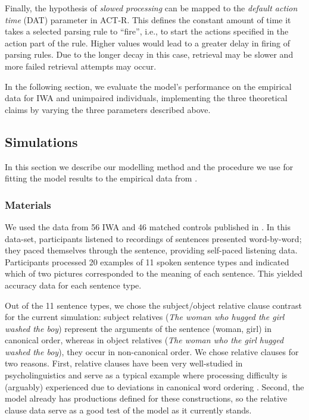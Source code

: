 \documentclass{cambridge7A}\usepackage[]{graphicx}\usepackage[]{color}
\begin{document}
Finally, the hypothesis of \emph{slowed processing} can be mapped to the \emph{default action time} (DAT) parameter in ACT-R. This defines the constant amount of time it takes a selected parsing rule to ``fire'', i.e., to start the actions specified in the action part of the rule. Higher values would lead to a greater delay in firing of parsing rules. Due to the longer decay in this case, retrieval may be slower and more failed retrieval attempts may occur. 

In the following section, we evaluate the model's performance on the empirical data for IWA and unimpaired individuals, implementing the three theoretical claims by varying the three parameters described above. 

\subsection{Simulations}

In this section we describe our modelling method and the procedure we use for fitting the model results to the empirical data from \cite{CaplanEtAl2015}.

\subsubsection{Materials}

We used the data from 56 IWA and 46 matched controls published in \cite{CaplanEtAl2015}. In this data-set, participants listened to recordings of sentences presented word-by-word; they paced themselves through the sentence, providing self-paced listening data. Participants processed 20 examples of 11 spoken sentence types and indicated which of two pictures corresponded to the meaning of each sentence. This yielded accuracy data for each sentence type. 

Out of the 11 sentence types, we chose the subject/object relative clause contrast for the current simulation:
subject relatives (\textit{The woman who hugged the girl washed the boy}) represent the arguments of the sentence (woman, girl) in canonical order, whereas in object relatives (\textit{The woman who the girl hugged washed the boy}), they occur in non-canonical order.
We chose relative clauses for two reasons. First, relative clauses have been very well-studied in psycholinguistics and serve as a typical example where processing difficulty is (arguably) experienced due to deviations in canonical word ordering \citep{JustCarpenter1992}.
Second, the \cite{LewisVasishth2005} model already has productions defined for these constructions, so the relative clause data serve as a good test of the model as it currently stands.
\end{document}

